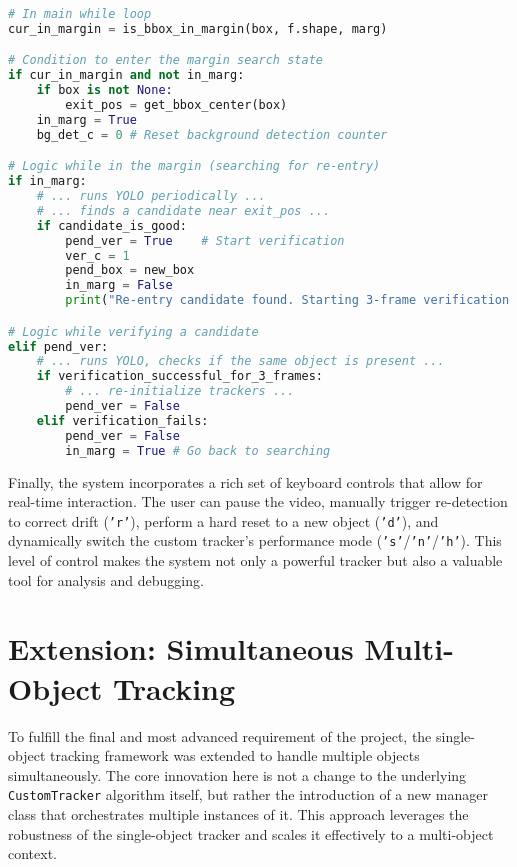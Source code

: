 \documentclass[12pt, a4paper]{article}
\begin{document}
\begin{lstlisting}[language=Python, caption={Core logic for the exit and re-entry state machine.}, label={lst:reentry_logic}]
# In main while loop
cur_in_margin = is_bbox_in_margin(box, f.shape, marg)

# Condition to enter the margin search state
if cur_in_margin and not in_marg:
    if box is not None:
        exit_pos = get_bbox_center(box)
    in_marg = True
    bg_det_c = 0 # Reset background detection counter

# Logic while in the margin (searching for re-entry)
if in_marg:
    # ... runs YOLO periodically ...
    # ... finds a candidate near exit_pos ...
    if candidate_is_good:
        pend_ver = True    # Start verification
        ver_c = 1
        pend_box = new_box
        in_marg = False
        print("Re-entry candidate found. Starting 3-frame verification...")

# Logic while verifying a candidate
elif pend_ver:
    # ... runs YOLO, checks if the same object is present ...
    if verification_successful_for_3_frames:
        # ... re-initialize trackers ...
        pend_ver = False
    elif verification_fails:
        pend_ver = False
        in_marg = True # Go back to searching
\end{lstlisting}

Finally, the system incorporates a rich set of keyboard controls that allow for real-time interaction. The user can pause the video, manually trigger re-detection to correct drift (\texttt{'r'}), perform a hard reset to a new object (\texttt{'d'}), and dynamically switch the custom tracker's performance mode (\texttt{'s'}/\texttt{'n'}/\texttt{'h'}). This level of control makes the system not only a powerful tracker but also a valuable tool for analysis and debugging.

\section{Extension: Simultaneous Multi-Object Tracking}
To fulfill the final and most advanced requirement of the project, the single-object tracking framework was extended to handle multiple objects simultaneously. The core innovation here is not a change to the underlying \lstinline!CustomTracker! algorithm itself, but rather the introduction of a new manager class that orchestrates multiple instances of it. This approach leverages the robustness of the single-object tracker and scales it effectively to a multi-object context.
\end{document}
